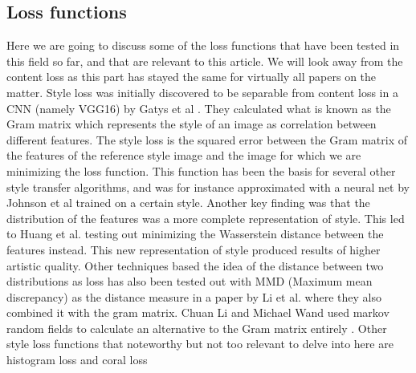 \subsection{Loss functions}
\label{sec:loss functions}
Here we are going to discuss some of the loss functions that have been tested in this field so far, and that are relevant to this article. We will look away from the content loss as this part has stayed the same for virtually all papers on the matter.
\newline\newline
Style loss was initially discovered to be separable from content loss in a CNN (namely VGG16) by Gatys et al \cite{Gatys:1}. They calculated what is known as the Gram matrix which represents the style of an image as correlation between different features. The style loss is the squared error between the Gram matrix of the features of the reference style image and the image for which we are minimizing the loss function. This function has been the basis for several other style transfer algorithms, and was for instance approximated with a neural net by Johnson et al \cite{Johnson:1} trained on a certain style.
\newline\newline
Another key finding was that the distribution of the features was a more complete representation of style. This led to Huang et al. \cite{Huang:1} testing out minimizing the Wasserstein distance between the features instead. This new representation of style produced results of higher artistic quality. Other techniques based the idea of the distance between two distributions as loss has also been tested out with MMD (Maximum mean discrepancy) as the distance measure in a paper by Li et al. \cite{Li:2} where they also combined it with the gram matrix. Chuan Li and Michael Wand used markov random fields to calculate an alternative to the Gram matrix entirely \cite{Li:3}. Other style loss functions that noteworthy but not too relevant to delve into here are histogram loss \cite{Risser:1} and coral loss \cite{sun:1}
\newline\newline
